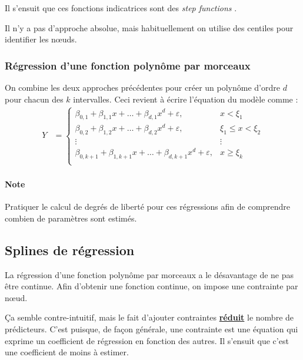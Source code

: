 \documentclass[french]{article}
\begin{document}
\begin{multicols*}{2}
Il s'ensuit que ces fonctions indicatrices sont des \og \textit{step functions} \fg{}.

\bigskip

Il n'y a pas d'approche absolue, mais habituellement on utilise des centiles pour identifier les nœuds.



\subsubsection{Régression d'une fonction polynôme par morceaux}
On combine les deux approches précédentes pour créer un polynôme d'ordre $d$ pour chacun des $k$ intervalles. Ceci revient à écrire l'équation du modèle comme : 
\begin{align*}
	Y
	&=	\begin{cases}
		\beta_{0, 1} + \beta_{1, 1}x + \dots + \beta_{d, 1} x^{d} + 	\varepsilon,	&	x < \xi_{1}	\\
		\beta_{0, 2} + \beta_{1, 2}x + \dots + \beta_{d, 2} x^{d} + 	\varepsilon,	&	\xi_{1} \leq x < \xi_{2}	\\
		\vdots	&	\vdots	\\
		\beta_{0, k + 1} + \beta_{1, k + 1}x + \dots + \beta_{d, k + 1} x^{d} + 	\varepsilon,	&	x \geq \xi_{k}	\\
		\end{cases}
\end{align*}


\paragraph{Note}	Pratiquer le calcul de degrés de liberté pour ces régressions afin de comprendre combien de paramètres sont estimés.



\columnbreak
\subsection{Splines de régression}
\begin{rappel_enhanced}[Contexte]
La régression d'une fonction polynôme par morceaux a le désavantage de ne pas être continue. Afin d'obtenir une fonction continue, on impose une contrainte par nœud. 

\bigskip

Ça semble contre-intuitif, mais le fait d'ajouter contraintes \textbf{\underline{réduit}} le nombre de prédicteurs. C'est puisque, de façon générale, une contrainte est une équation qui exprime un coefficient de régression en fonction des autres. Il s'ensuit que c'est une coefficient de moins à estimer.


\end{rappel_enhanced}
\end{multicols*}
\end{document}
